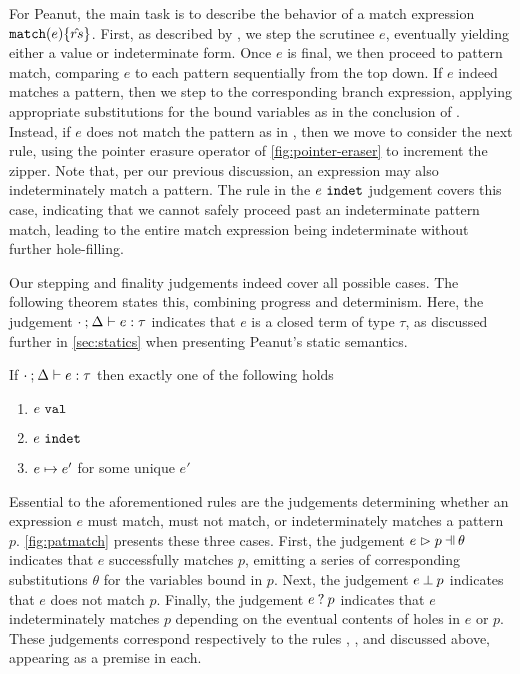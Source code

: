 For Peanut, the main task is to describe the behavior of a match expression $\mathtt{match}(e) \{\hat{rs}\}$. First, as described by \ITExpMatch, we step the scrutinee $e$, eventually yielding either a value or indeterminate form. Once $e$ is final, we then proceed to pattern match, comparing $e$ to each pattern sequentially from the top down. If $e$ indeed matches a pattern, then we step to the corresponding branch expression, applying appropriate substitutions for the bound variables as in the conclusion of \ITSuccMatch. Instead, if $e$ does not match the pattern as in \ITFailMatch, then we move to consider the next rule, using the pointer erasure operator of \autoref{fig:pointer-eraser} to increment the zipper. Note that, per our previous discussion, an expression may also indeterminately match a pattern. The \IMatch rule in the $e ~\mathtt{indet}$ judgement covers this case, indicating that we cannot safely proceed past an indeterminate pattern match, leading to the entire match expression being indeterminate without further hole-filling.

Our stepping and finality judgements indeed cover all possible cases. The following theorem states this, combining progress and determinism. Here, the judgement $\cdot \mathbin{;} \Delta \vdash e : \tau$ indicates that $e$ is a closed term of type $\tau$, as discussed further in \autoref{sec:statics} when presenting Peanut's static semantics.

\begin{theorem}
	\label{theorem:determinism}
	If $\cdot \mathbin{;} \Delta \vdash e : \tau$ then exactly one of the following holds
	\begin{enumerate}
		\item $e ~\mathtt{val}$
		\item $e ~\mathtt{indet}$
		\item $e \mapsto e'$ for some unique $e'$
	\end{enumerate}
\end{theorem}

Essential to the aforementioned rules are the judgements determining whether an expression $e$ must match, must not match, or indeterminately matches a pattern $p$. \autoref{fig:patmatch} presents these three cases. First, the judgement $\hpatmatch{e}{p}{\theta}$ indicates that $e$ successfully matches $p$, emitting a series of corresponding substitutions $\theta$ for the variables bound in $p$. Next, the judgement $e \mathbin{\bot} p$ indicates that $e$ does not match $p$. Finally, the judgement $e \mathbin{?} p$ indicates that $e$ indeterminately matches $p$ depending on the eventual contents of holes in $e$ or $p$. These judgements correspond respectively to the rules \ITSuccMatch, \ITFailMatch, and \IMatch discussed above, appearing as a premise in each.

